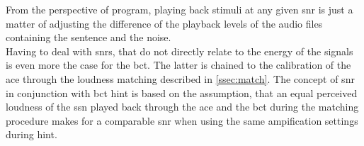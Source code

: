 From the perspective of program, playing back stimuli at any given \gls{snr} is just a matter of adjusting the difference of the playback levels of the audio files containing the sentence and the noise.\\
Having to deal with \gls{snr}s, that do not directly relate to the energy of the signals is even more the case for the \gls{bct}. The latter is chained to the calibration of the \gls{ace} through the loudness matching described in \autoref{ssec:match}. 
The concept of \gls{snr} in conjunction with \gls{bct} \gls{hint} is based on the assumption, that an equal perceived loudness of the \gls{ssn} played back through the \gls{ace} and the \gls{bct} during the matching procedure makes for a comparable \gls{snr} when using the same ampification settings during \gls{hint}.